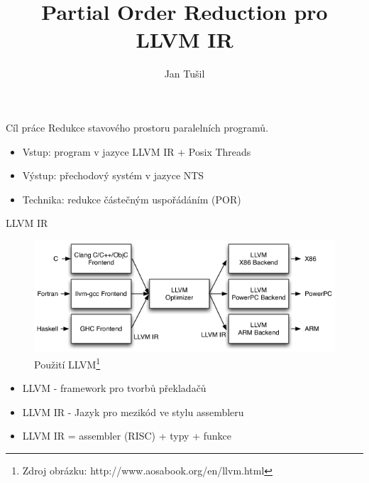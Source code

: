\documentclass[11pt]{beamer}
\author{Jan Tušil}
\date{\displaydate{date}}
\title{Partial Order Reduction pro LLVM IR}
\date{\displaydate{date}}
\begin{document}


\newtheorem{question}{Otázka}

\begin{frame}{Cíl práce}
Redukce stavového prostoru
paralelních programů.
\begin{itemize}
\item Vstup: program v jazyce LLVM IR + Posix Threads
\item Výstup: přechodový systém v jazyce NTS
\item Technika: redukce částečným uspořádáním (POR)
\end{itemize}
\end{frame}

\begin{frame}{LLVM IR}
\begin{figure}
\includegraphics[scale=0.4]{LLVMCompiler1.png}
\caption{Použití LLVM\footnote{Zdroj obrázku: http://www.aosabook.org/en/llvm.html}}
\end{figure}
\begin{itemize}
\item LLVM - framework pro tvorbů překladačů
\item LLVM IR - Jazyk pro mezikód ve stylu assembleru
\item LLVM IR = assembler (RISC) + typy + funkce
\end{itemize}
\end{frame}
\end{document}
